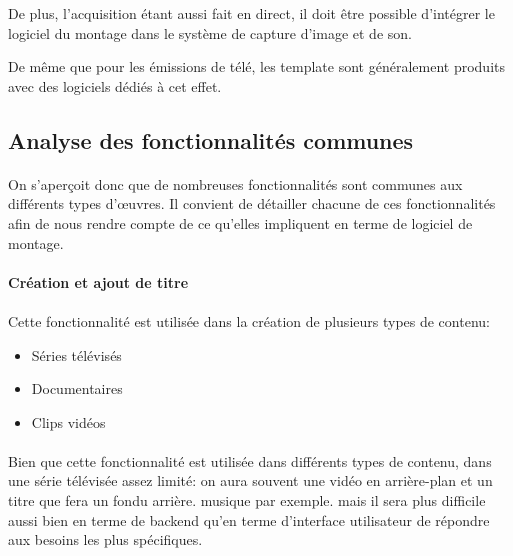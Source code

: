 De plus, l'acquisition étant aussi fait en direct, il doit être possible
d'intégrer le logiciel du montage dans le système de capture d'image
et de son.

De même que pour les émissions de télé, les template sont
généralement produits avec des logiciels dédiés à cet effet.

\subsection{Analyse des fonctionnalités communes}

\paragraph{}

On s'aperçoit donc que de nombreuses fonctionnalités sont communes aux
différents types d'œuvres. Il convient de détailler chacune de ces
fonctionnalités afin de nous rendre compte de ce qu'elles impliquent
en terme de logiciel de montage.

\paragraph{Création et ajout de titre}

\paragraph{}

Cette fonctionnalité est utilisée dans la création de plusieurs types
de contenu: \begin{itemize} \setlength{\itemsep}{2mm}
  \item {Séries télévisés} \item {Documentaires} \item {Clips vidéos}
\end{itemize}

\paragraph{}

Bien que cette fonctionnalité est utilisée dans différents
types de contenu, %
dans une série télévisée %
assez limité: on aura souvent une vidéo en arrière-plan et un titre que
fera un fondu arrière. %
musique par exemple. %
mais il sera plus difficile aussi bien en terme de backend qu'en terme
d'interface utilisateur de répondre aux besoins les plus spécifiques.

